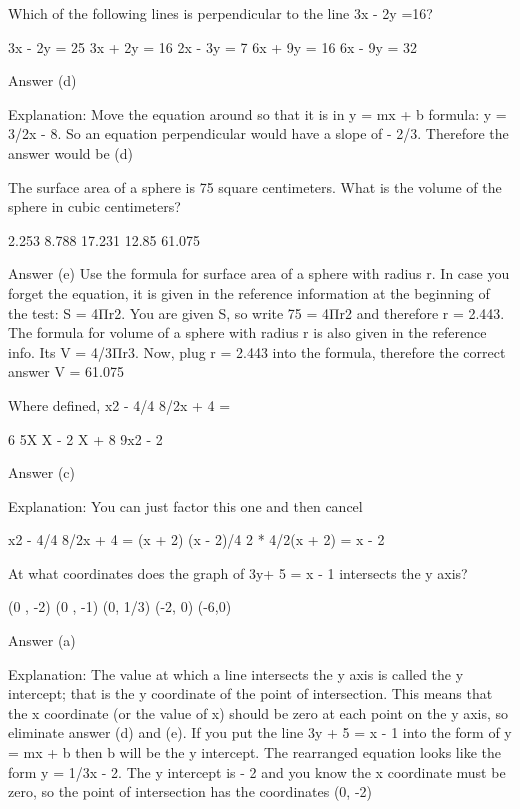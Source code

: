 Which of the following lines is perpendicular to the line 3x - 2y =16?

    3x - 2y = 25
    3x + 2y = 16
    2x - 3y = 7
    6x  + 9y = 16
    6x - 9y = 32 

Answer (d)

Explanation: Move the equation around so that it is in y = mx + b formula: y = 3/2x - 8. So an equation perpendicular would have a slope of - 2/3. Therefore the answer would be (d)

The surface area of a sphere is 75 square centimeters. What is the volume of the sphere in cubic centimeters?

    2.253
    8.788
    17.231
    12.85
    61.075 

Answer (e) Use the formula for surface area of a sphere with radius r. In case you forget the equation, it is given in the reference information at the beginning of the test: S = 4Πr2. You are given S, so write 75 = 4Πr2 and therefore r = 2.443. The formula for volume of a sphere with radius r is also given in the reference info. Its V = 4/3Πr3. Now, plug r = 2.443 into the formula, therefore the correct answer V = 61.075

Where defined, {x2 - 4/4} {8/2x + 4} =

    6
    5X
    X - 2
    X + 8
    9x2 - 2 

Answer (c)

Explanation: You can just factor this one and then cancel

{x2 - 4/4} {8/2x + 4} = {(x + 2) (x - 2)/4} {2 * 4/2(x + 2)} = x - 2 




    At what coordinates does the graph of 3y+ 5 = x - 1 intersects the y axis?

        (0 , -2)
        (0 , -1)
        (0, 1/3)
        (-2, 0)
        (-6,0) 

    Answer (a)

    Explanation: The value at which a line intersects the y axis is called the y intercept; that is the y coordinate of the point of intersection. This means that the  x coordinate (or the value of x) should be  zero at each point on the y axis, so eliminate answer (d) and (e). If you put the line 3y + 5 = x - 1 into the form of y = mx + b then b will be the y intercept. The rearranged equation looks like the form y = 1/3x - 2. The y intercept is - 2 and you know the x coordinate must be zero, so the point of intersection has the coordinates (0, -2)

